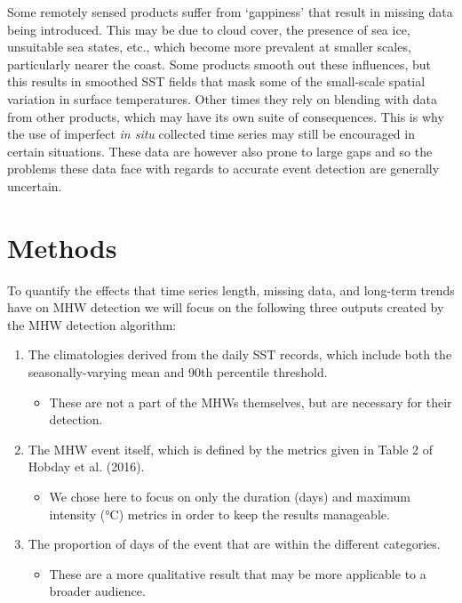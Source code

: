 \documentclass[]{article}
\providecommand{\tightlist}{%
  \setlength{\itemsep}{0pt}\setlength{\parskip}{0pt}}
\begin{document}
Some remotely sensed products suffer from `gappiness' that result in
missing data being introduced. This may be due to cloud cover, the
presence of sea ice, unsuitable sea states, etc., which become more
prevalent at smaller scales, particularly nearer the coast. Some
products smooth out these influences, but this results in smoothed SST
fields that mask some of the small-scale spatial variation in surface
temperatures. Other times they rely on blending with data from other
products, which may have its own suite of consequences. This is why the
use of imperfect \emph{in situ} collected time series may still be
encouraged in certain situations. These data are however also prone to
large gaps and so the problems these data face with regards to accurate
event detection are generally uncertain.

\hypertarget{methods}{%
\section{Methods}\label{methods}}

To quantify the effects that time series length, missing data, and
long-term trends have on MHW detection we will focus on the following
three outputs created by the MHW detection algorithm:

\begin{enumerate}
\def\labelenumi{\arabic{enumi})}
\tightlist
\item
  The climatologies derived from the daily SST records, which include
  both the seasonally-varying mean and 90th percentile threshold.

  \begin{itemize}
  \tightlist
  \item
    These are not a part of the MHWs themselves, but are necessary for
    their detection.
  \end{itemize}
\item
  The MHW event itself, which is defined by the metrics given in Table 2
  of Hobday et al. (2016).

  \begin{itemize}
  \tightlist
  \item
    We chose here to focus on only the duration (days) and maximum
    intensity (°C) metrics in order to keep the results manageable.
  \end{itemize}
\item
  The proportion of days of the event that are within the different
  categories.

  \begin{itemize}
  \tightlist
  \item
    These are a more qualitative result that may be more applicable to a
    broader audience.
  \end{itemize}
\end{enumerate}
\end{document}
